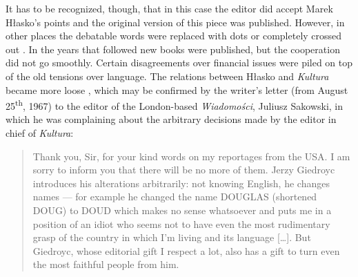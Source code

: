 \begin{paper}
\noindent It has to be recognized, though, that in this case the editor did accept
Marek Hłasko's points and the original version of this piece was
published. However, in other places the debatable words were replaced
with dots or completely crossed out \citep[81 and 141]{hlasko_drugie_1965}.
In the years that followed new books were published, but the
cooperation did not go smoothly. Certain disagreements over financial
issues were piled on top of the old tensions over language. The relations
between Hłasko and \emph{Kultura} became more loose \citep{tyrchan_marek_2007}, which may be confirmed by the writer's letter (from August
25\textsuperscript{th}, 1967) to the editor of the London-based
\emph{Wiadomości}, Juliusz Sakowski, in which he was complaining about
the arbitrary decisions made by the editor in chief of \emph{Kultura}:

\begin{quote}
Thank you, Sir, for your kind words on my reportages from the USA. I am
sorry to inform you that there will be no more of them. Jerzy Giedroyc
introduces his alterations arbitrarily: not knowing English, he changes
names --- for example he changed the name DOUGLAS (shortened DOUG) to
DOUD which makes no sense whatsoever and puts me in a position of an
idiot who seems not to have even the most rudimentary grasp of the
country in which I'm living and its language {[}\ldots{}{]}. But Giedroyc,
whose editorial gift I respect a lot, also has a gift to turn even the
most faithful people from him.
\begin{flushright}
\citep[114]{kielanowski_kulisy_1967}
\end{flushright}
\end{quote}


\end{paper}
